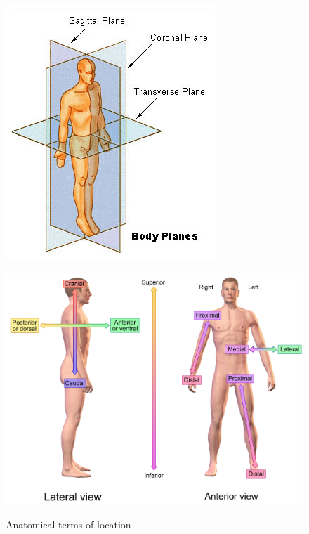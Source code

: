\begin{figure}[htb]
	\centering
	\begin{minipage}[t]{0.38\linewidth}
		\centering
		\includegraphics[width=1\linewidth]{Pictures/bodyPlanes}
		\label{fig:bodyPlanes}
	\end{minipage}
	\hfill
	\begin{minipage}[t]{0.6\linewidth}
		\centering
		\includegraphics[width=1\linewidth]{Pictures/bodyDirectionalReferences}
		\label{fig:bodyDirectionalReferences}
	\end{minipage}
	\caption{Anatomical terms of location}
	\label{fig:bodyWikiAnatomicalTermsOfLocation}
\end{figure}

